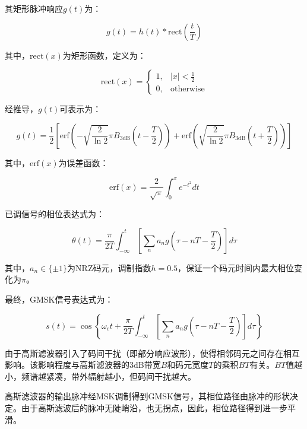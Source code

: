 \documentclass[12pt,a4paper,twoside]{article}
\numberwithin{equation}{section}
\begin{document}
其矩形脉冲响应$g(t)$为：

\begin{equation}
    g(t) = h(t) * \text{rect}\left(\frac{t}{T}\right)
\end{equation}

其中，$\text{rect}(x)$为矩形函数，定义为：

\begin{equation}
    \text{rect}(x) = 
    \begin{cases}
        1, & |x| < \frac{1}{2} \\
        0, & \text{otherwise}
    \end{cases}
\end{equation}

经推导，$g(t)$可表示为：

\begin{equation}
    g(t) = \frac{1}{2} \left[ \text{erf}\left( -\sqrt{\frac{2}{\ln 2}} \pi B_{\text{3dB}} \left(t - \frac{T}{2}\right) \right) + \text{erf}\left( \sqrt{\frac{2}{\ln 2}} \pi B_{\text{3dB}} \left(t + \frac{T}{2}\right) \right) \right]
\end{equation}

其中，$\text{erf}(x)$为误差函数：

\begin{equation}
    \text{erf}(x) = \frac{2}{\sqrt{\pi}} \int_0^x e^{-t^2} dt
\end{equation}

已调信号的相位表达式为：

\begin{equation}
    \theta(t) = \frac{\pi}{2T} \int_{-\infty}^{t} \left[ \sum_n a_n g\left(\tau - nT - \frac{T}{2}\right) \right] d\tau
\end{equation}

其中，$a_n \in \{\pm 1\}$为NRZ码元，调制指数$h = 0.5$，保证一个码元时间内最大相位变化为$\pi$。

最终，GMSK信号表达式为：

\begin{equation}
    s(t) = \cos\left\{ \omega_c t + \frac{\pi}{2T} \int_{-\infty}^{t} \left[ \sum_n a_n g\left(\tau - nT - \frac{T}{2}\right) \right] d\tau \right\}
\end{equation}

由于高斯滤波器引入了码间干扰（即部分响应波形），使得相邻码元之间存在相互影响。该影响程度与高斯滤波器的3dB带宽$B$和码元宽度$T$的乘积$BT$有关。$BT$值越小，频谱越紧凑，带外辐射越小，但码间干扰越大。

高斯滤波器的输出脉冲经MSK调制得到GMSK信号，其相位路径由脉冲的形状决定。由于高斯滤波后的脉冲无陡峭沿，也无拐点，因此，相位路径得到进一步平滑。
\end{document}

